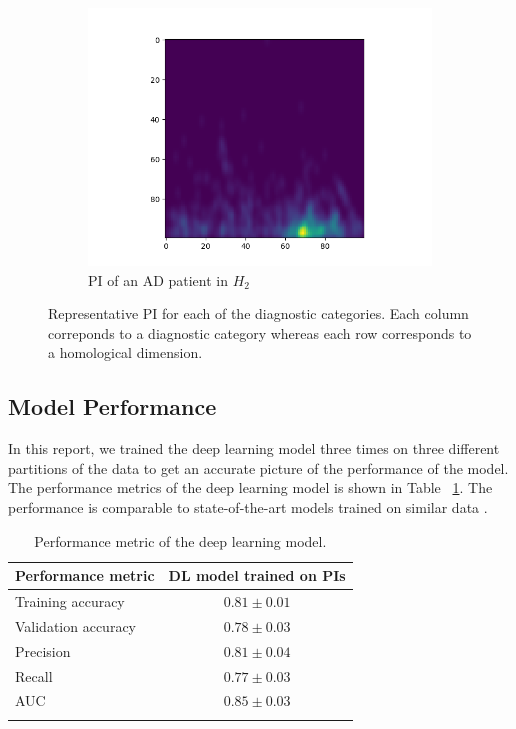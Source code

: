 \documentclass{article}
\begin{document}
\begin{figure}
\begin{subfigure}{0.32\textwidth}
    \includegraphics[width=\textwidth]{figures/PIs/Persistence_image_AD_h_2.png}
    \caption{PI of an AD patient in $H_2$}
  \end{subfigure}
  \caption{Representative PI for each of the diagnostic categories. Each column correponds to a diagnostic category whereas each row corresponds to a homological dimension.}
  \label{fig:sample_rep_pi}
\end{figure}

\subsection{Model Performance}

In this report, we trained the deep learning model three times on three different partitions of the data to get an accurate picture of the performance of the model. The performance metrics of the deep learning model is shown in Table ~\ref{tab:performance}. The performance is comparable to state-of-the-art models trained on similar data \citep{wen2020convolutional}.

\begin{table}
  \centering
  \begin{tabular}{lc}
    \toprule
    \textbf{Performance metric} & \textbf{DL model trained on PIs}\\
    \midrule
    Training accuracy & $0.81\pm 0.01$  \\
    Validation accuracy & $0.78\pm 0.03$  \\
    Precision & $0.81\pm 0.04$  \\
    Recall & $0.77\pm 0.03$  \\
    AUC & $0.85\pm 0.03$  \\
    \bottomrule
    \vspace{1pt}
  \end{tabular}
  \caption{Performance metric of the deep learning model.}
  \label{tab:performance}
\end{table}
\end{document}
